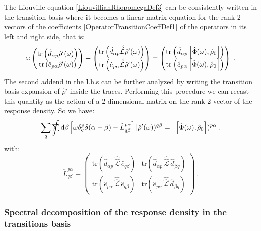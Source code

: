 \documentclass[a4paper]{article}
\newcommand{\dd}{{\rm d}}
\newcommand{\sint}{\mathrlap{\displaystyle\int}
\mathrlap{\textstyle\sum}
\phantom{\mathrlap{\displaystyle
\int}\textstyle\sum}}
\newcommand{\be}{\begin{equation}}
\newcommand{\ee}{\end{equation}}
\newcommand{\nn}{\notag}
\newcommand{\lb}{\label}
\newcommand{\mat}[1]{\begin{pmatrix} #1\end{pmatrix}}
\newcommand{\op}[1]{\hat {#1}}
\newcommand{\sop}[1]{\op{\op {#1}}}
\newcommand{\commutator}[2]{\left[ {#1} , {#2} \right]}
\newcommand{\trace}[1]{\mathrm{tr}\left(#1\right)}
\newcommand{\optr}[1]{\check #1}
\newcommand{\sket}[2]{| #2)^{#1}}
\newcommand{\dmnot}{\op{\rho}_0}
\newcommand{\dm}{\op{\rho}}
\newcommand{\excite}[2]{\op e_{{#1}{#2}}}
\newcommand{\decay}[2]{\op d_{{#1}{#2}}}
\newcommand{\Liouv}{\sop{\mathcal L}}
\begin{document}
The Liouville equation \eqref{LiouvillianRhopomegaDef3} can be consistently written in the transition basis where it becomes a linear matrix equation for the 
rank-2 vectors of the coefficients \eqref{OperatorTransitionCoeffDef1} of the operators in its left and right side, that is:
\be
\omega\mat{ \trace{\decay{\alpha}{p}\dm'(\omega)} \\ \trace{\excite{p}{\alpha}\dm'(\omega)}} - 
\mat{ \trace{\decay{\alpha}{p}\Liouv\dm'(\omega)} \\ \trace{\excite{p}{\alpha}\Liouv\dm'(\omega)}} =
\mat{ \trace{\decay{\alpha}{p}\commutator{\op\Phi(\omega)}{\dmnot}} \\ \trace{\excite{p}{\alpha}\commutator{\op\Phi(\omega)}{\dmnot}}}
\;.\nn
\ee
The second addend in the l.h.s can be further analyzed by writing the transition basis expansion of $\dm'$ inside the traces. Performing this procedure
we can recast this quantity as the action of a 2-dimensional matrix on the rank-2 vector of the response density. So we have: 
\be\lb{LiouvilleTransBasisDef1}
\sum_q\sint\dd\beta \left[\omega\delta_q^p\delta(\alpha-\beta)- \optr{L}^{p \alpha}_{q\beta} \right]\sket{q\beta}{\dm'(\omega)} =
\sket{p\alpha}{\commutator{\op\Phi(\omega)}{\dmnot}} \;.
\ee
with:
\be\lb{LiouvilleMatrixTransBasisDef1}
\optr{L}^{p \alpha}_{q\beta} \equiv \mat{\trace{\decay{\alpha}{p}\, \Liouv\, \excite{q}{\beta}} &
\trace{\decay{\alpha}{p}\, \Liouv\, \decay{\beta}{q}} \\
\trace{\excite{p}{\alpha}\, \Liouv\, \excite{q}{\beta}} &
\trace{\excite{p}{\alpha}\, \Liouv\, \decay{\beta}{q}}} \;.
\ee

\subsubsection{Spectral decomposition of the response density in the transitions basis}
\end{document}

